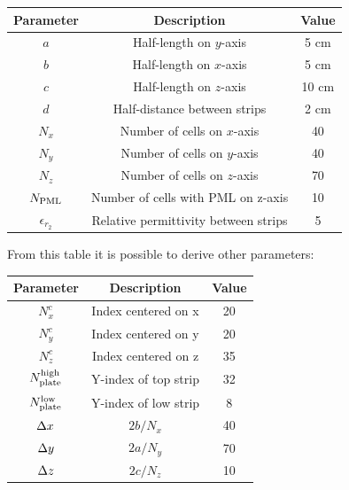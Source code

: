 \begin{table}[H]
    \centering
    \begin{tabular}{|c|c|c|}
    \hline
    \textbf{Parameter} & \textbf{Description}               & \textbf{Value} \\ \hline
    $a$                & Half-length on $y$-axis              & 5 cm           \\ \hline
    $b$                & Half-length on $x$-axis              & 5 cm           \\ \hline
    $c$                & Half-length on $z$-axis              & 10 cm          \\ \hline
    $d$                & Half-distance between strips       & 2 cm           \\ \hline
    $N_x$              & Number of cells on $x$-axis          & 40             \\ \hline
    $N_y$              & Number of cells on $y$-axis          & 40             \\ \hline
    $N_z$              & Number of cells on $z$-axis          & 70             \\ \hline
    $N_{\textnormal{PML}}$          & Number of cells with PML on z-axis & 10             \\ \hline
    $\epsilon_{r_2}$          & Relative permittivity between strips & 5             \\ \hline
    \end{tabular}
\end{table}

From this table it is possible to derive other parameters:

\begin{table}[H]
    \centering
    \begin{tabular}{|c|c|c|}
    \hline
    \textbf{Parameter}                           & \textbf{Description} & \textbf{Value} \\ \hline
    $N_x^c$                                      & Index centered on x  & 20             \\ \hline
    $N_y^c$                                      & Index centered on y  & 20             \\ \hline
    $N_z^c$                                      & Index centered on z  & 35             \\ \hline
    $N_{\textnormal{plate}}^{\textnormal{high}}$ & Y-index of top strip & 32             \\ \hline
    $N_{\textnormal{plate}}^{\textnormal{low}}$  & Y-index of low strip & 8              \\ \hline
    $\Delta x$                                        & ${2b}/{N_x}$         & 40             \\ \hline
    $\Delta y$                                        & ${2a}/{N_y}$         & 70             \\ \hline
    $\Delta z$                                        & ${2c}/{N_z}$         & 10             \\ \hline
    \end{tabular}
\end{table}

